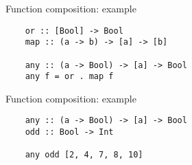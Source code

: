 \documentclass[20pt]{beamer}
\begin{document}
\begin{frame}[fragile]{Function composition: example}
    \begin{lstlisting}
    or :: [Bool] -> Bool
    map :: (a -> b) -> [a] -> [b]

    any :: (a -> Bool) -> [a] -> Bool
    any f = or . map f
    \end{lstlisting}
\end{frame}

\begin{frame}[fragile]{Function composition: example}
    \begin{lstlisting}
    any :: (a -> Bool) -> [a] -> Bool
    odd :: Bool -> Int

    any odd [2, 4, 7, 8, 10]
    \end{lstlisting}
\end{frame}
\end{document}
